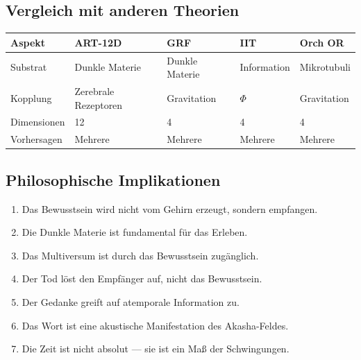 \subsection{Vergleich mit anderen Theorien}
\begin{table}[H]
\centering
\begin{tabular}{@{}lllll@{}}
\toprule
\textbf{Aspekt} & \textbf{ART-12D} & \textbf{GRF} & \textbf{IIT} & \textbf{Orch OR} \\ \midrule
Substrat & Dunkle Materie & Dunkle Materie & Information & Mikrotubuli \\
Kopplung & Zerebrale Rezeptoren & Gravitation & $\Phi$ & Gravitation \\
Dimensionen & 12 & 4 & 4 & 4 \\
Vorhersagen & Mehrere & Mehrere & Mehrere & Mehrere \\ \bottomrule
\end{tabular}
\end{table}

\subsection{Philosophische Implikationen}
\begin{enumerate}
    \item Das Bewusstsein wird nicht vom Gehirn erzeugt, sondern empfangen.
    \item Die Dunkle Materie ist fundamental für das Erleben.
    \item Das Multiversum ist durch das Bewusstsein zugänglich.
    \item Der Tod löst den Empfänger auf, nicht das Bewusstsein.
    \item Der Gedanke greift auf atemporale Information zu.
    \item Das Wort ist eine akustische Manifestation des Akasha-Feldes.
    \item Die Zeit ist nicht absolut --- sie ist ein Maß der Schwingungen.
\end{enumerate}

